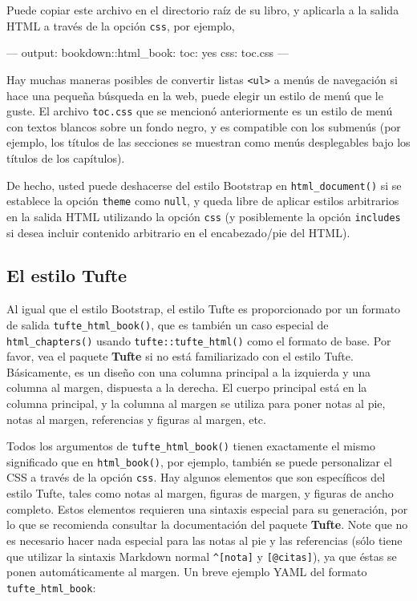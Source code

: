 \documentclass[12pt,]{krantz}
\makeatletter
\newenvironment{Shaded}{\begin{snugshade}}{\end{snugshade}}
\newcommand{\OtherTok}[1]{\textcolor[rgb]{0.56,0.35,0.01}{{#1}}}
\newcommand{\FunctionTok}[1]{\textcolor[rgb]{0.00,0.00,0.00}{{#1}}}
\newcommand{\NormalTok}[1]{{#1}}
\newenvironment{kframe}{%
\medskip{}
\setlength{\fboxsep}{.8em}
 \def\at@end@of@kframe{}%
 \ifinner\ifhmode%
  \def\at@end@of@kframe{\end{minipage}}%
  \begin{minipage}{\columnwidth}%
 \fi\fi%
 \def\FrameCommand##1{\hskip\@totalleftmargin \hskip-\fboxsep
 \colorbox{shadecolor}{##1}\hskip-\fboxsep
     \hskip-\linewidth \hskip-\@totalleftmargin \hskip\columnwidth}%
 \MakeFramed {\advance\hsize-\width
   \@totalleftmargin\z@ \linewidth\hsize
   \@setminipage}}%
 {\par\unskip\endMakeFramed%
 \at@end@of@kframe}
\renewenvironment{Shaded}{\begin{kframe}}{\end{kframe}}
\theoremstyle{definition}
\theoremstyle{definition}
\theoremstyle{remark}
\makeatother
\begin{document}
Puede copiar este archivo en el directorio raíz de su libro, y aplicarla
a la salida HTML a través de la opción \texttt{css}, por ejemplo,

\begin{Shaded}
\begin{Highlighting}[]
\OtherTok{---}
\FunctionTok{output:}
  \FunctionTok{bookdown:}\NormalTok{:html_book:}
    \FunctionTok{toc:} \NormalTok{yes}
    \FunctionTok{css:} \NormalTok{toc.css}
\OtherTok{---}
\end{Highlighting}
\end{Shaded}

Hay muchas maneras posibles de convertir listas
\texttt{\textless{}ul\textgreater{}} a menús de navegación si hace una
pequeña búsqueda en la web, puede elegir un estilo de menú que le guste.
El archivo \texttt{toc.css} que se mencionó anteriormente es un estilo
de menú con textos blancos sobre un fondo negro, y es compatible con los
submenús (por ejemplo, los títulos de las secciones se muestran como
menús desplegables bajo los títulos de los capítulos).

De hecho, usted puede deshacerse del estilo Bootstrap en
\texttt{html\_document()} si se establece la opción \texttt{theme} como
\texttt{null}, y queda libre de aplicar estilos arbitrarios en la salida
HTML utilizando la opción \texttt{css} (y posiblemente la opción
\texttt{includes} si desea incluir contenido arbitrario en el
encabezado/pie del HTML).

\subsection{El estilo Tufte}\label{el-estilo-tufte}

Al igual que el estilo Bootstrap, el estilo Tufte es proporcionado por
un formato de salida \texttt{tufte\_html\_book()}, que es también un
caso especial de \texttt{html\_chapters()} usando
\texttt{tufte::tufte\_html()} como el formato de base. Por favor, vea el
paquete \textbf{Tufte} \citep{R-tufte} si no está familiarizado con el
estilo Tufte. Básicamente, es un diseño con una columna principal a la
izquierda y una columna al margen, dispuesta a la derecha. El cuerpo
principal está en la columna principal, y la columna al margen se
utiliza para poner notas al pie, notas al margen, referencias y figuras
al margen, etc.

Todos los argumentos de \texttt{tufte\_html\_book()} tienen exactamente
el mismo significado que en \texttt{html\_book()}, por ejemplo, también
se puede personalizar el CSS a través de la opción \texttt{css}. Hay
algunos elementos que son específicos del estilo Tufte, tales como notas
al margen, figuras de margen, y figuras de ancho completo. Estos
elementos requieren una sintaxis especial para su generación, por lo que
se recomienda consultar la documentación del paquete \textbf{Tufte}.
Note que no es necesario hacer nada especial para las notas al pie y las
referencias (sólo tiene que utilizar la sintaxis Markdown normal
\texttt{\^{}{[}nota{]}} y \texttt{{[}@citas{]}}), ya que éstas se ponen
automáticamente al margen. Un breve ejemplo YAML del formato
\texttt{tufte\_html\_book}:
\end{document}

